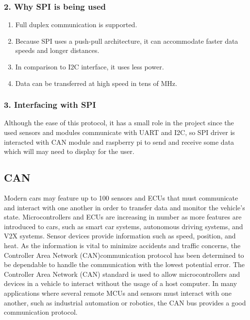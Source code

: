\subsubsection{2. Why SPI is being used}
\begin{enumerate}
    \item Full duplex communication is supported.
    \item Because SPI uses a push-pull architecture, it can accommodate faster data speeds and longer distances.
    \item In comparison to I2C interface, it uses less power.
    \item Data can be transferred at high speed in tens of MHz.
\end{enumerate}

\subsubsection{3. Interfacing with SPI}
Although the ease of this protocol, it has a small role in the project since the used sensors and modules communicate with UART and I2C, so SPI driver is interacted with CAN module and raspberry pi to send and receive some data which will may need to display for the user.

\subsection{CAN}
Modern cars may feature up to 100 sensors and ECUs that must communicate and interact with one another in order to transfer data and monitor the vehicle's state. Microcontrollers and ECUs are increasing in number as more features are introduced to cars, such as smart car systems, autonomous driving systems, and V2X systems. Sensor devices provide information such as speed, position, and heat. As the information is vital to minimize accidents and traffic concerns, the Controller Area Network (CAN)communication protocol has been determined to be dependable to handle the communication with the lowest potential error. The Controller Area Network (CAN) standard is used to allow microcontrollers and devices in a vehicle to interact without the usage of a host computer. In many applications where several remote MCUs and sensors must interact with one another, such as industrial automation or robotics, the CAN bus provides a good communication protocol.


